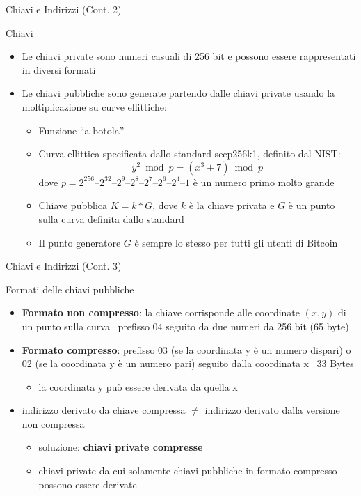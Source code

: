 \documentclass{beamer}
\begin{document}
  \begin{frame}{Chiavi e Indirizzi (Cont. 2)}
    \begin{block}{Chiavi}
      \begin{itemize}
        \item Le chiavi private sono numeri casuali di 256 bit e possono essere rappresentati in diversi formati \pause
        \item Le chiavi pubbliche sono generate partendo dalle chiavi private usando la moltiplicazione su curve ellittiche: \pause
        \begin{itemize}
          \item Funzione ``a botola'' 
          \item Curva ellittica specificata dallo standard secp256k1, definito dal NIST:
          \[ y^2 \bmod p = (x^3 + 7) \bmod p \]
          dove $p = 2^{256} – 2^{32} – 2^9 – 2^8 – 2^7 – 2^6 – 2^4 – 1$ è un numero primo molto grande 
          \item Chiave pubblica $K=k*G$, dove $k$ è la chiave privata e $G$ è un punto sulla curva definita dallo standard 
          \item Il punto generatore $G$ è sempre lo stesso per tutti gli utenti di Bitcoin
        \end{itemize}
      \end{itemize}
    \end{block}
  \end{frame}





  \begin{frame}{Chiavi e Indirizzi (Cont. 3)}
    \begin{block}{Formati delle chiavi pubbliche}
      \begin{itemize}
        \item \textbf{Formato non compresso}: la chiave corrisponde alle coordinate $(x,y)$ di un punto sulla curva \MVRightarrow\, prefisso $04$ seguito da due numeri da 256 bit (65 byte) \pause
        \item \textbf{Formato compresso}: prefisso $03$ (se la coordinata y è un numero dispari) o $02$ (se la coordinata y è un numero pari) seguito dalla coordinata x \MVRightarrow\, 33 Bytes
        \begin{itemize}
          \item la coordinata y può essere derivata da quella x \pause
        \end{itemize}
        \item indirizzo derivato da chiave compressa $\neq$ indirizzo derivato dalla versione non compressa \pause
        \begin{itemize}
          \item soluzione: \textbf{chiavi private compresse}
          \item chiavi private da cui solamente chiavi pubbliche in formato compresso possono essere derivate
        \end{itemize}
      \end{itemize}
    \end{block}
  \end{frame}
\end{document}
